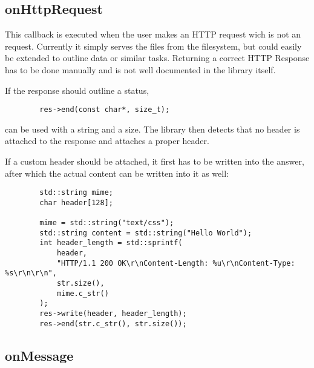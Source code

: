 \subsection{onHttpRequest} %
\label{subsec:devguide:server:onhttprequest}

This callback  is executed  when the user  makes an HTTP  request wich  is not
an   request. Currently  it  simply serves  the  files from  the
filesystem, but  could easily be  extended to  outline data or  similar tasks.
Returning a  correct HTTP  Response has to  be done manually  and is  not well
documented in the library itself.

If the response should outline a  status,
\begin{tcolorbox}
    \begin{verbatim}
        res->end(const char*, size_t);
    \end{verbatim}
\end{tcolorbox}
\noindent can be used with a string  and a size. The library then detects that
no header  is attached  to the  response and attaches  a proper  
header.

If a  custom header should be  attached, it first  has to be written  into the
answer, after which the actual content can be written into it as well:
\begin{tcolorbox}
    \begin{verbatim}
        std::string mime;
        char header[128];

        mime = std::string("text/css");
        std::string content = std::string("Hello World");
        int header_length = std::sprintf(
            header,
            "HTTP/1.1 200 OK\r\nContent-Length: %u\r\nContent-Type: %s\r\n\r\n",
            str.size(),
            mime.c_str()
        );
        res->write(header, header_length);
        res->end(str.c_str(), str.size());
    \end{verbatim}
\end{tcolorbox}



\subsection{onMessage} %
\label{subsec:devguide:server:onmessage}

